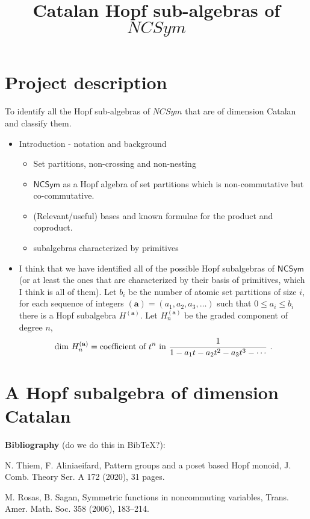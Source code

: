 \documentclass{article}
\title{Catalan Hopf sub-algebras of $NCSym$}
\author{}
\begin{document}
\maketitle

\section{Project description}

\noindent
To identify all the Hopf sub-algebras of $NCSym$ that are of dimension Catalan and classify them.


\begin{itemize}
\item Introduction - notation and background
\begin{itemize}
\item Set partitions, non-crossing and non-nesting
\item $\mathsf{NCSym}$ as a Hopf algebra of set partitions which is non-commutative but co-commutative.
\item (Relevant/useful) bases and known formulae for the product and coproduct.
\item subalgebras characterized by primitives
\end{itemize}
\item I think that we have identified all of the possible Hopf subalgebras of $\mathsf{NCSym}$
(or at least the ones that are characterized by their basis of primitives, which I think is all of them).
Let $b_i$ be the number of atomic set partitions of size $i$, for each sequence of integers $(\mathbf{a}) = (a_1, a_2, a_3,\ldots)$ such that
$0 \leq a_i \leq b_i$ there is a Hopf subalgebra $H^{(\mathbf{a})}$.
Let $H^{(\mathbf{a})}_n$ be the graded component of degree $n$,
$$\mathrm{dim}~H^{(\mathbf{a})}_n = \hbox{coefficient of }t^n\hbox{ in }\frac{1}{1 - a_1 t - a_2 t^2 - a_3 t^3 - \cdots}~.$$
\end{itemize}

\section{A Hopf subalgebra of dimension Catalan}

\noindent
{\bf Bibliography} (do we do this in BibTeX?):

N. Thiem, F. Aliniaeifard, Pattern groups and a poset based Hopf monoid, J. Comb. Theory Ser. A 172 (2020), 31 pages.

M. Rosas, B. Sagan, Symmetric functions in noncommuting variables, Trans. Amer. Math. Soc. 358 (2006), 183--214.
\end{document}
